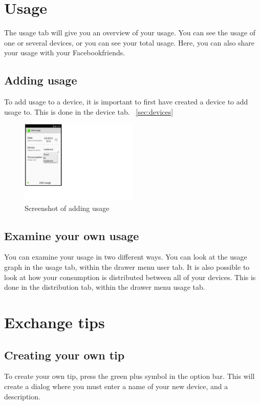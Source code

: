 \section{Usage}
The usage tab will give you an overview of your usage. You can see the usage of one or several devices, or you can see your total usage. Here, you can also share your usage with your Facebookfriends.
\subsection{Adding usage}
To add usage to a device, it is important to first have created a device to add usage to. This is done in the device tab. ~\ref{sec:devices}

\begin{figure}[H]
\centering
\includegraphics[width=0.5\textwidth, clip, trim=0cm 4cm 19.5cm 0cm]{appendix/usermanual/fig/AddUsage.png}
\caption{Screenshot of adding usage}
\end{figure}

\subsection{Examine your own usage}
You can examine your usage in two different ways. You can look at the usage graph in the usage tab, within the drawer menu user tab. It is also possible to look at how your consumption is distributed between all of your devices. This is done in the distribution tab, within the drawer menu usage tab. 


\section{Exchange tips}

\subsection{Creating your own tip}
To create your own tip, press the green plus symbol in the option bar. This will create a dialog where you must enter a name of your new device, and a description. 
